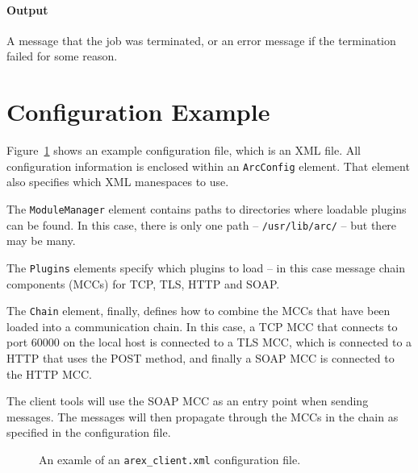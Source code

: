 \documentclass{article}                            %
\begin{document}
\paragraph{Output} A message that the job was terminated, or an error
message if the termination failed for some reason.


\appendix





\section{Configuration Example}
\label{app:config}
Figure~\ref{fig:config} shows an example configuration file, which is
an XML file. All configuration information is enclosed within an
\verb:ArcConfig: element. That element also specifies which XML
manespaces to use.

The \verb:ModuleManager: element contains paths to directories where
loadable plugins can be found. In this case, there is only one path --
\verb:/usr/lib/arc/: -- but there may be many.

The \verb:Plugins: elements specify which plugins to load -- in this
case message chain components (MCCs) for TCP, TLS, HTTP and SOAP.

The \verb:Chain: element, finally, defines how to combine the MCCs
that have been loaded into a communication chain. In this case, a TCP
MCC that connects to port 60000 on the local host is connected to a TLS
MCC, which is connected to a HTTP that uses the POST method, and
finally a SOAP MCC is connected to the HTTP MCC.

The client tools will use the SOAP MCC as an entry point when sending
messages. The messages will then propagate through the MCCs in the
chain as specified in the configuration file.

\begin{figure}
\begin{shaded}

\end{shaded}
\caption{An examle of an \texttt{arex\_client.xml} configuration file.}
\label{fig:config}
\end{figure}


\clearpage

\end{document}
